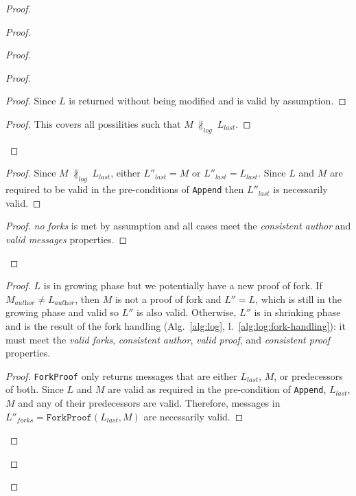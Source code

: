\documentclass[9pt, oneside]{article}   	%
\begin{document}
\begin{proof}
\begin{proof}
\begin{proof}
\begin{proof}
					\begin{proof}
						Since $L$ is returned without being modified and is valid by assumption.
					\end{proof}
					
					\qedstep{}
					\begin{proof}
						This covers all possilities such that $M ~\nparallel_\textit{log}~ L_\textit{last}$.
					\end{proof}					
			\end{proof}
			
			\begin{proof}
				Since $M ~\nparallel_\textit{log}~ L_\textit{last}$, either $L''_\textit{last} = M$ or $L''_\textit{last} = L_\textit{last}$. Since $L$ and $M$ are required to be valid in the pre-conditions of \texttt{Append} then $L''_\textit{last}$ is necessarily valid.
			\end{proof}
			
			\qedstep{}
			\begin{proof}
				\textit{no forks} is met by assumption and all cases meet the \textit{consistent author} and \textit{valid messages} properties.
			\end{proof}
		\end{proof}
		
		\begin{proof}
			$L$ is in growing phase but we potentially have a new proof of fork. If $M_\textit{author} \neq L_\textit{author}$, then $M$ is not a proof of fork and $L'' = L$, which is still in the growing phase and valid so $L''$ is also valid. Otherwise,  $L''$ is in shrinking phase and is the result of the fork handling (Alg.~\ref{alg:log}, l.~\ref{alg:log:fork-handling}): it must meet the \textit{valid forks}, \textit{consistent author}, \textit{valid proof}, and \textit{consistent proof} properties.
			

				\begin{proof}
					\texttt{ForkProof} only returns messages that are either $L_\textit{last}$, $M$, or predecessors of both. Since $L$ and $M$ are valid as required in the pre-condition of \texttt{Append}, $L_\textit{last}$, $M$ and any of their predecessors are valid. Therefore, messages in $L''_\textit{forks} = \texttt{ForkProof}(L_\textit{last}, M)$ are necessarily valid.
				\end{proof}
			

\end{proof}
\end{proof}
\end{proof}
\end{document}
